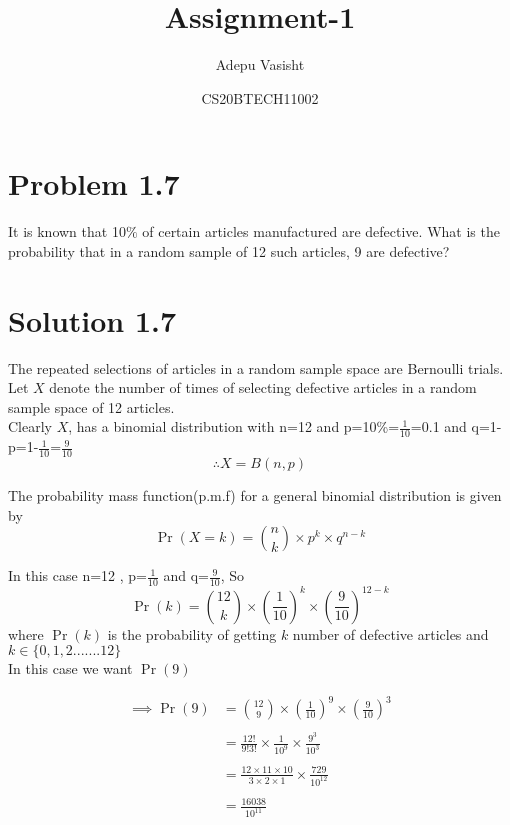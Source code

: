\documentclass[journal,12pt,twocolumn]{IEEEtran}
\title{Assignment-1}
\author{Adepu Vasisht}
\date{CS20BTECH11002}
\providecommand{\brak}[1]{\ensuremath{\left(#1\right)}}
\begin{document}
\maketitle

\section*{Problem 1.7}
It is known that 10$\%$ of certain articles manufactured are defective. What is the probability that in a random sample of 12 such articles, 9 are defective?
\section*{Solution 1.7}
The repeated selections of articles in a random sample space are Bernoulli trials. Let $X$ denote the number of times of selecting defective articles in a random sample space of 12 articles.\\

Clearly $X$, has a binomial distribution with n=12 and p=10\%=$\frac{1}{10}$=0.1
and q=1-p=1-$\frac{1}{10}$=$\frac{9}{10}$\\

$$\therefore X = B \brak{n,p}$$

The probability mass function(p.m.f) for a general binomial distribution is given by $$\Pr \brak{X=k} = {n \choose k} \times p^k\times q^{n-k}$$

In this case n=12 , p=$\frac{1}{10}$ and q=$\frac{9}{10}$, So 
$$\Pr\brak{k}={12 \choose k}\times(\frac{1}{10})^k\times(\frac{9}{10})^{12-k}$$
where $\Pr\brak{k}$ is the probability of getting $k$ number of defective articles and $k\in \{0,1,2.......12\}$\\

In this case we want $\Pr\brak{9}$ 
    
\begin{align}
  \implies\Pr\brak{9} &={12 \choose 9}\times(\frac{1}{10})^9\times(\frac{9}{10})^{3} \\\nonumber\\  &=\frac{12!}{9!3!}\times\frac{1}{10^9}\times\frac{9^3}{10^3}\\\nonumber\\
  &=\frac{12\times11\times10}{3\times2\times1}\times\frac{729}{10^{12}}\\\nonumber\\
  &=\frac{16038}{10^{11}}\\\nonumber\\\nonumber
\end{align}
 
\end{document}
